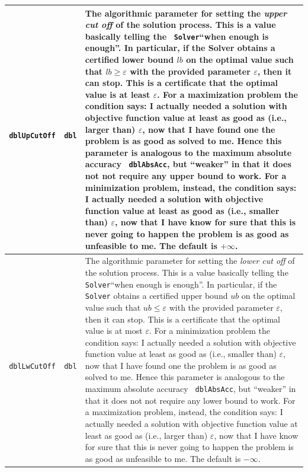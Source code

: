 \documentclass[a4paper]{article}
\newcommand{\code}[1]{\textrm{\texttt{\hyphenchar\font=200 #1}}}
\def\Solver{\code{Solver}\xspace}
\begin{document}
\begin{longtable}{|c|c|p{13cm}|}
 \code{dblUpCutOff} & \code{dbl} & The algorithmic parameter for setting the \emph{upper cut off} of the solution process. This is a value basically telling the \Solver ``when enough is enough''. In particular, if the Solver obtains a certified lower bound $lb$ on the optimal value such that $lb \geq \varepsilon$ with the provided parameter $\varepsilon$, then it can stop. This is a certificate that the optimal value is at least $\varepsilon$. For a maximization problem the condition says: I actually needed a solution with objective function value at least as good as (i.e., larger than) $\varepsilon$, now that I have found one the problem is as good as solved to me. Hence this parameter is analogous to the maximum absolute accuracy \code{dblAbsAcc}, but ``weaker'' in that it does not not require any upper bound to work. For a minimization problem, instead, the condition says: I actually needed a solution with objective function value at least as good as (i.e., smaller than) $\varepsilon$, now that I have know for sure that this is never going to happen the problem is as good as unfeasible to me. The default is $+\infty$.\\
 \hline
 \code{dblLwCutOff} & \code{dbl} & The algorithmic parameter for setting the \emph{lower cut off} of the solution process. This is a value basically telling the \Solver ``when enough is enough''. In particular, if the \Solver obtains a certified upper bound $ub$ on the optimal value such that $ub \leq \varepsilon$ with the provided parameter $\varepsilon$, then it can stop. This is a certificate that the optimal value is at most $\varepsilon$. For a minimization problem the condition says: I actually needed a solution with objective function value at least as good as (i.e., smaller than) $\varepsilon$, now that I have found one the problem is as good as solved to me. Hence this parameter is analogous to the maximum absolute accuracy \code{dblAbsAcc}, but ``weaker'' in that it does not not require any lower bound to work. For a maximization problem, instead, the condition says: I actually needed a solution with objective function value at least as good as (i.e., larger than) $\varepsilon$, now that I have know for sure that this is never going to happen the problem is as good as unfeasible to me. The default is $-\infty$.\\
 \hline

\end{longtable}
\end{document}
